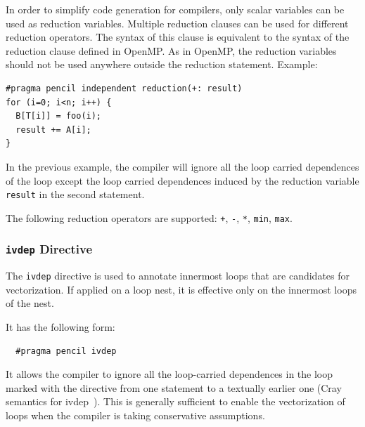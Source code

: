   In order to simplify code generation for \pencil compilers, only scalar
  variables can be used as reduction variables.
  Multiple reduction clauses can be used for different reduction operators.
  The syntax of this clause is equivalent to the syntax of the reduction clause
  defined in OpenMP.  As in OpenMP, the reduction variables should not
  be used anywhere outside the reduction statement.  Example:
  \begin{lstlisting}[language=pencil]
#pragma pencil independent reduction(+: result)
for (i=0; i<n; i++) {
  B[T[i]] = foo(i);
  result += A[i];
}
  \end{lstlisting}
  In the previous example, the compiler will ignore all the loop carried
  dependences of the loop except the loop carried dependences induced by
  the reduction variable \lstinline!result! in the second statement.

The following reduction operators are supported:
\lstinline!+!, \lstinline!-!, \lstinline!*!, \lstinline!min!, \lstinline!max!.

\subsubsection{\texttt{ivdep} Directive\label{sec:ivdep}}

The \lstinline!ivdep! directive is used to annotate innermost loops that are candidates
  for vectorization.  If applied on a loop nest, it is effective only on
  the innermost loops of the nest.

  It has the following form:
  \begin{lstlisting}
  #pragma pencil ivdep
  \end{lstlisting}
  
  It allows the
  compiler to ignore all the loop-carried dependences in the loop marked with
  the directive from one statement to a textually earlier one (Cray semantics for ivdep~\cite{cray}).
  This is generally sufficient to enable the vectorization
  of loops when the compiler is taking conservative assumptions.

